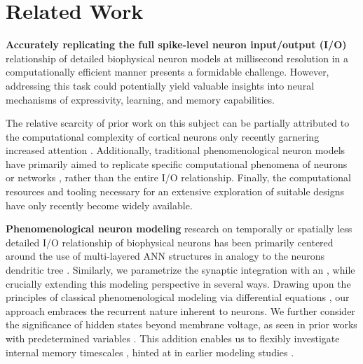 \documentclass{article} \usepackage{iclr2024_doc_style,times}
\begin{document}
\section{Related Work}
\label{related_work}

\textbf{Accurately replicating the full spike-level neuron input/output (I/O)} relationship of detailed biophysical neuron models at millisecond resolution in a computationally efficient manner presents a formidable challenge. However, addressing this task could potentially yield valuable insights into neural mechanisms of expressivity, learning, and memory capabilities. 

The relative scarcity of prior work on this subject can be partially attributed to the computational complexity of cortical neurons only recently garnering increased attention \cite{tzilivaki2019challenging,beniaguev2021single,larkum2022dendrites,poirazi2020illuminating}. Additionally, traditional phenomenological neuron models have primarily aimed to replicate specific computational phenomena of neurons or networks \cite{koch1997computation,izhikevich2004model,herz2006modeling}, rather than the entire I/O relationship. Finally, the computational resources and tooling necessary for an extensive exploration of suitable designs have only recently become widely available. 

\textbf{Phenomenological neuron modeling} research on temporally or spatially less detailed I/O relationship of biophysical neurons has been primarily centered around the use of multi-layered ANN structures in analogy to the neurons dendritic tree \cite{poirazi2003pyramidal,tzilivaki2019challenging,ujfalussy2018global}. Similarly, we parametrize the synaptic integration with an , while crucially extending this modeling perspective in several ways. Drawing upon the principles of classical phenomenological modeling via differential equations \cite{izhikevich2004model,dayan2005theoretical}, our approach embraces the recurrent nature inherent to neurons. We further consider the significance of hidden states  beyond membrane voltage, as seen in prior works with predetermined variables \cite{brette2005adaptive,gerstner2014neuronal}. This addition enables us to flexibly investigate internal memory timescales , hinted at in earlier modeling studies \cite{gjorgjieva2016computational,cavanagh2020diversity}.
\end{document}
